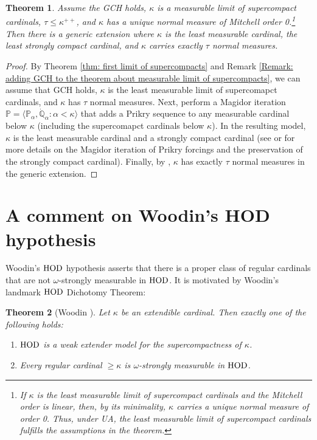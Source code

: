 \documentclass[11pt]{amsart}
\newtheorem{theorem}{Theorem}[section]
\theoremstyle{definition}
\theoremstyle{remark}
\newcommand\HOD{\textnormal{HOD}}
\newcommand\<{{<}}
\newcommand{\po}{\mathbb{P}}
\newcommand{\qo}{\mathbb{Q}}
\newcommand{\la}{\langle}
\newcommand{\ra}{\rangle}
\begin{document}
\begin{theorem}\label{thm: Goldberg-Woodin}
    Assume the {\rm{GCH}} holds, $\kappa$ is a  measurable limit of supercompact cardinals, $\tau\leq \kappa^{++}$, and $\kappa$ has a unique normal measure of Mitchell order 0.\footnote{If $\kappa$ is the least measurable limit of supercompact cardinals and the Mitchell order is linear, then, by its minimality, $\kappa$ carries a unique normal measure of order 0. Thus, under UA, the least measurable limit of supercompact cardinals fulfills the assumptions in the theorem.} Then there is a generic extension where $\kappa$ is the least measurable cardinal, the least strongly compact cardinal, and $\kappa$ carries exactly $\tau$ normal measures.
\end{theorem}

\begin{proof}
    By Theorem \ref{thm: first limit of supercompacts} and Remark \ref{Remark: adding GCH to the theorem about measurable limit of supercompacts}, we can assume that GCH holds, $\kappa$ is the least measurable limit of supercomapct cardinals, and $\kappa$ has $\tau$ normal measures. Next, perform a Magidor iteration $\po = \la \po_\alpha, \dot{\qo}_\alpha \colon \alpha<\kappa \ra$ that adds a Prikry sequence to any measurable cardinal below $\kappa$ (including the supercomapct cardinals below $\kappa$). In the resulting model, $\kappa$ is the least measurable cardinal and a strongly compact cardinal (see \cite{MagidorIdentity} or \cite{Gitik-handbook} for more details on the Magidor iteration of Prikry forcings and the preservation of the strongly compact cardinal). Finally, by \cite[Theorem 0.1]{KaplanMagidorIterations}, $\kappa$ has exactly $\tau$ normal measures in the generic extension.
\end{proof}



\section{A comment on Woodin's HOD hypothesis}

Woodin’s $\HOD$ hypothesis asserts that there is a proper class of regular cardinals that are not $\omega$-strongly measurable in $\HOD$. It is motivated by Woodin’s landmark $\HOD$ Dichotomy Theorem:

\begin{theorem}[Woodin \cite{midrasha}]
Let $\kappa$ be an extendible cardinal. Then exactly one of the following holds:
\begin{enumerate}
\item $\HOD$ is a weak extender model for the supercompactness of $\kappa$.
\item Every regular cardinal $\geq \kappa$ is $\omega$-strongly measurable in $\HOD$.
\end{enumerate}
\end{theorem}
\end{document}
